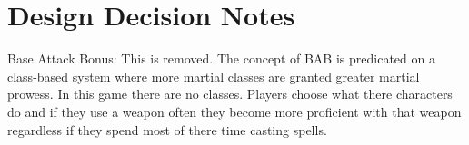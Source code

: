 \documentclass{article}
\begin{document}
\section{Design Decision Notes}
 
Base Attack Bonus: This is removed. The concept of BAB is predicated on a class-based system where more martial classes are granted greater martial prowess. In this game there are no classes. Players choose what there characters do and if they use a weapon often they become more proficient with that weapon regardless if they spend most of there time casting spells.
 
 
 
\end{document}
